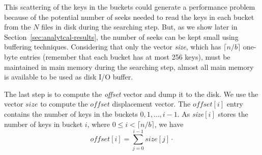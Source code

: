 This scattering of the keys in the buckets could generate a performance
problem because of the potential number of seeks  
needed to read the keys in each bucket from the $N$ files in disk 
during the searching step. 
But, as we show later in Section~\ref{sec:analytcal-results}, the number of seeks 
can be kept small using buffering techniques.
Considering that only the vector {\it size}, which has $\lceil n/b \rceil$
one-byte entries (remember that each bucket has at most 256 keys),
must be maintained in main memory during the searching step,
almost all main memory is available to be used as disk I/O buffer.

The last step is to compute the {\it offset} vector and dump it to the disk.
We use the vector $\mathit{size}$ to compute the
$\mathit{offset}$ displacement vector. 
The $\mathit{offset}[i]$ entry contains the number of keys 
in the buckets $0, 1, \dots, i-1$.
As {\it size}$[i]$ stores the number of keys
in bucket $i$, where $0 \leq i <\lceil n/b \rceil$, we have
\begin{displaymath}
\mathit{offset}[i] = \sum_{j=0}^{i-1} \mathit{size}[j] \cdot
\end{displaymath}
 
